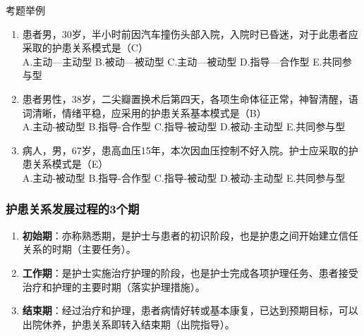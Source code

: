 \documentclass[11pt, a4paper]{ctexart}
\begin{document}
\begin{examplebox}{考题举例}
\begin{enumerate}
    \item 患者男，30岁，半小时前因汽车撞伤头部入院，入院时已昏迷，对于此患者应采取的护患关系模式是（C）\\
    A.主动—主动型 \quad B.被动—被动型 \quad C.主动—被动型 \quad D.指导—合作型 \quad E.共同参与型
    \item 患者男性，38岁，二尖瓣置换术后第四天，各项生命体征正常，神智清醒，语词清晰，情绪平稳，应采用的护患关系基本模式是（B）\\
    A.主动-被动型 \quad B.指导-合作型 \quad C.指导-被动型 \quad D.被动-主动型 \quad E.共同参与型
    \item 病人，男，67岁，患高血压15年，本次因血压控制不好入院。护士应采取的护患关系模式是（E）\\
    A.主动-被动型 \quad B.指导-合作型 \quad C.指导-被动型 \quad D.被动-主动型 \quad E.共同参与型
\end{enumerate}
\end{examplebox}

\subsubsection{护患关系发展过程的3个期}
\begin{enumerate}
    \item \textbf{初始期}：亦称熟悉期，是护士与患者的初识阶段，也是护患之间开始建立信任关系的时期（主要任务）。
    \item \textbf{工作期}：是护士实施治疗护理的阶段，也是护士完成各项护理任务、患者接受治疗和护理的主要时期（落实护理措施）。
    \item \textbf{结束期}：经过治疗和护理，患者病情好转或基本康复，已达到预期目标，可以出院休养，护患关系即转入结束期（出院指导）。
\end{enumerate}
\end{document}
